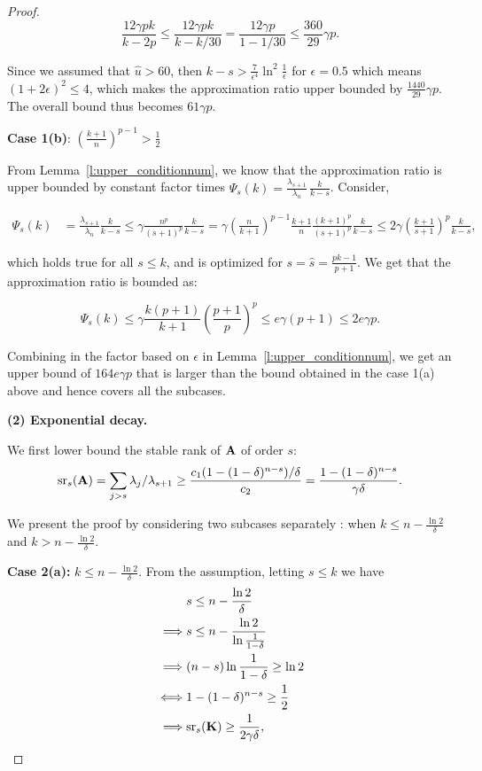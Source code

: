 \documentclass{article}
\begin{document}
\begin{proof}
  \[ \frac{12\gamma pk}{k-2p} \leq \frac{12\gamma pk}{k-k/30} =
    \frac{12\gamma p}{1-1/30} \leq \frac{360}{29}\gamma  p.  \] 
  
  Since we assumed that $\hat u> 60$, then $k-s> \frac{7}{\epsilon^4}
  \ln^2\frac{1}{\epsilon}$ for $\epsilon = 0.5$ which means
  $(1+2\epsilon)^2 \leq 4$, which makes the approximation ratio upper
  bounded by $ \frac{1440}{29}\gamma p  $. The overall bound
  thus becomes $61 \gamma p$. 
  
  
  \bigskip 
  \textbf{Case 1(b)}: $\left(\frac{k+1}{n}\right)^{p-1} >\frac12$
  
  From Lemma~\ref{l:upper_conditionnum}, we know that the
  approximation ratio is upper bounded by constant factor times
  $\Psi_s(k)=\frac{\lambda_{s+1}}{\lambda_n}\,\frac{k}{k-s}$. Consider,  
  
  \begin{align*}
    \Psi_s(k) &= \frac{\lambda_{s+1}}{\lambda_n}\frac{k}{k-s}\leq
      \gamma\frac{n^p}{(s+1)^p}\frac{k}{k-s} =\gamma
      \left(\frac{n}{k+1}\right)^{p-1}
      \frac{k+1}{n}\frac{{(k+1)^p}}{{(s+1)^p}} \frac{k}{k-s}
    \leq 2\gamma\left(\frac{k+1}{s+1}\right)^p \frac{k}{k-s},
  \end{align*}
  
  which holds true for all $s \leq k$, and is optimized for $s=
  \hat{s}=\frac{pk-1}{p+1}$. We get that the approximation
  ratio is bounded as: 
  
  \[\Psi_s(k) \leq
    \gamma\frac{k(p+1)}{k+1}\left(\frac{p+1}{p}\right)^p \leq
    e\gamma(p+1)\leq 2e\gamma p. \] 
  
  Combining in the factor based on $\epsilon$ in
  Lemma~\ref{l:upper_conditionnum}, we get an upper bound of
  $164e\gamma p$ that is larger than the bound obtained in the case
  1(a) above and hence covers all the subcases. 
  
\textbf{  (2) Exponential decay.}
  
  
We  first lower bound the stable rank of $\mathbf A$ of order $s$:
  \[ {\mathrm{sr}}_s(\mathbf A) = \sum_{j>s} \lambda_j/\lambda_{s+1} \geq
    \frac{c_1(1-(1-\delta)^{n-s})/\delta }{c_2} =
    \frac{1-(1-\delta)^{n-s}}{\gamma\delta}. 
  \]
  
  We present the proof by considering two subcases separately : when
  $k\leq n-  \frac{\ln 2}{\delta}$ and $k>n-  \frac{\ln 2}{\delta}$. 
  
  \textbf{Case 2(a):}  $k\leq n-  \frac{\ln 2}{\delta}$. From the
  assumption, letting $s\leq k$  we have
  \begin{align*}
& s \leq n - \frac{\ln 2}{\delta}  \\
    \implies  & s \leq n - \frac{\ln 2}{\ln \frac{1}{1-\delta}} \\
    \implies  & (n-s)\ln \frac{1}{1-\delta} \geq \ln 2\\
    \iff & 1 - (1-\delta)^{n-s} \geq \frac{1}{2}   \\
    \implies & {\mathrm{sr}}_s(\mathbf K) \geq \frac{1}{2\gamma \delta},
  \end{align*}
  

\end{proof}
\end{document}
